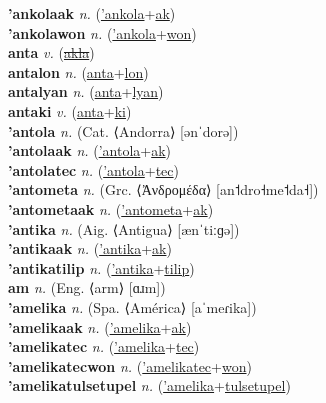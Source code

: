 \textbf{'ankolaak} \textit{n.} (\hyperref['ankola]{'ankola}+\hyperref[ak]{ak})
 \label{'ankolaak} \\
\textbf{'ankolawon} \textit{n.} (\hyperref['ankola]{'ankola}+\hyperref[won]{won})
 \label{'ankolawon} \\
\textbf{anta} \textit{v.} (\hyperref[akla]{\sout{akla}})
 \label{anta} \\
\textbf{antalon} \textit{n.} (\hyperref[anta]{anta}+\hyperref[lon]{lon})
 \label{antalon} \\
\textbf{antalyan} \textit{n.} (\hyperref[anta]{anta}+\hyperref[lyan]{lyan})
 \label{antalyan} \\
\textbf{antaki} \textit{v.} (\hyperref[anta]{anta}+\hyperref[ki]{ki})
 \label{antaki} \\
\textbf{'antola} \textit{n.} (Cat. ⟨Andorra⟩ [ənˈdorə])
 \label{'antola} \\
\textbf{'antolaak} \textit{n.} (\hyperref['antola]{'antola}+\hyperref[ak]{ak})
 \label{'antolaak} \\
\textbf{'antolatec} \textit{n.} (\hyperref['antola]{'antola}+\hyperref[tec]{tec})
 \label{'antolatec} \\
\textbf{'antometa} \textit{n.} (Grc. ⟨Ἀνδρομέδα⟩ [an˦dro˧me˦da˧])
 \label{'antometa} \\
\textbf{'antometaak} \textit{n.} (\hyperref['antometa]{'antometa}+\hyperref[ak]{ak})
 \label{'antometaak} \\
\textbf{'antika} \textit{n.} (Aig. ⟨Antigua⟩ [ænˈtiːɡə])
 \label{'antika} \\
\textbf{'antikaak} \textit{n.} (\hyperref['antika]{'antika}+\hyperref[ak]{ak})
 \label{'antikaak} \\
\textbf{'antikatilip} \textit{n.} (\hyperref['antika]{'antika}+\hyperref[tilip]{tilip})
 \label{'antikatilip} \\
\textbf{am} \textit{n.} (Eng. ⟨arm⟩ [ɑɹm])
 \label{am} \\
\textbf{'amelika} \textit{n.} (Spa. ⟨América⟩ [aˈmeɾika])
 \label{'amelika} \\
\textbf{'amelikaak} \textit{n.} (\hyperref['amelika]{'amelika}+\hyperref[ak]{ak})
 \label{'amelikaak} \\
\textbf{'amelikatec} \textit{n.} (\hyperref['amelika]{'amelika}+\hyperref[tec]{tec})
 \label{'amelikatec} \\
\textbf{'amelikatecwon} \textit{n.} (\hyperref['amelikatec]{'amelikatec}+\hyperref[won]{won})
 \label{'amelikatecwon} \\
\textbf{'amelikatulsetupel} \textit{n.} (\hyperref['amelika]{'amelika}+\hyperref[tulsetupel]{tulsetupel})
